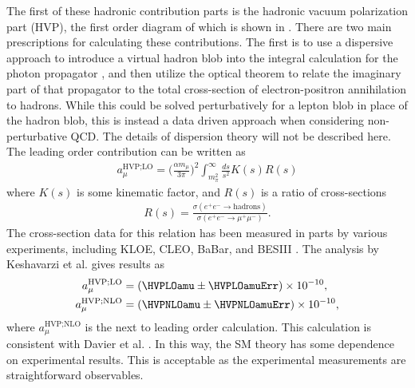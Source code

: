The first of these hadronic contribution parts is the hadronic vacuum polarization part (HVP), the first order diagram of which is shown in . There are two main prescriptions for calculating these contributions. The first is to use a dispersive approach to introduce a virtual hadron blob into the integral calculation for the photon propagator \cite{Jeger}, and then utilize the optical theorem to relate the imaginary part of that propagator to the total cross-section of electron-positron annihilation to hadrons. While this could be solved perturbatively for a lepton blob in place of the hadron blob, this is instead a data driven approach when considering non-perturbative QCD. The details of dispersion theory will not be described here. The leading order contribution can be written as 
		\begin{align}
            a_{\mu}^{\text{HVP;LO}} = \Big(\frac{\alpha m_{\mu}}{3\pi}\Big)^{2} \int_{m_{\pi}^{2}}^{\infty} \frac{ds}{s^{2}} K(s) R(s)
		\end{align}
where $K(s)$ is some kinematic factor, and $R(s)$ is a ratio of cross-sections
		\begin{align}
            R(s) = \frac{\sigma(e^{+}e^{-} \rightarrow \text{hadrons})}{\sigma(e^{+}e^{-} \rightarrow \mu^{+}\mu^{-})}.
		\end{align}
The cross-section data for this relation has been measured in parts by various experiments, including KLOE, CLEO, BaBar, and BESIII \cite{KLOE,CLEO,BaBar,BESIII}. The analysis by Keshavarzi et al. \cite{Keshavarzi:2018mgv} gives results as 
		\begin{equation}
		\begin{aligned}
            a_{\mu}^{\text{HVP;LO}} &= (\HVPLOamu \pm \HVPLOamuErr) \times 10^{-10}, \\
            a_{\mu}^{\text{HVP;NLO}} &= (\HVPNLOamu \pm \HVPNLOamuErr) \times 10^{-10}, 
		\end{aligned}
		\end{equation}
where $a_{\mu}^{\text{HVP;NLO}}$ is the next to leading order calculation. This calculation is consistent with Davier et al. \cite{HVP2}. In this way, the SM theory has some dependence on experimental results. This is acceptable as the experimental measurements are straightforward observables.

